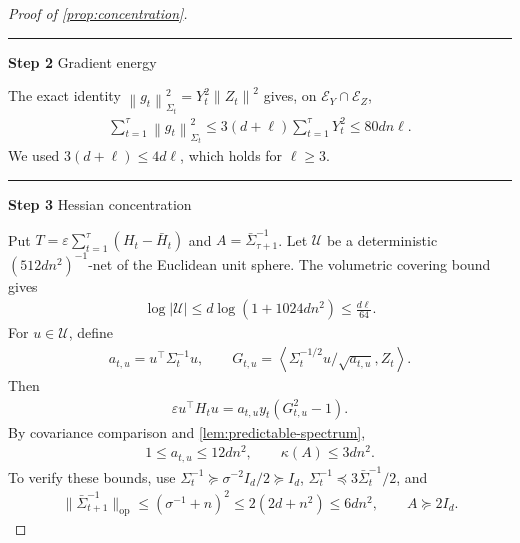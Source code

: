 \documentclass{article}
\newcommand{\proofstep}[2]{%
    \par\medskip
    \noindent
    \textcolor{blue!55!black}{\rule{2pt}{1.2em}}%
    \hspace{0.6em}%
    {\sffamily\bfseries\color{blue!55!black}Step #1}%
    \quad
    {\sffamily #2}%
    \par\smallskip
}
\newcommand{\op}{\mathrm{op}}
\newcommand{\1}{\mathbf 1}
\newcommand{\eps}{\varepsilon}
\newcommand{\ip}[2]{\left\langle #1,#2\right\rangle}
\newcommand{\norm}[1]{\left\lVert #1\right\rVert}
\newcommand{\normm}[2]{\left\lVert #1\right\rVert_{#2}}
\begin{document}
\begin{proof}[Proof of \cref{prop:concentration}]
    \proofstep{2}{Gradient energy}
    The exact identity
    $\normm{g_t}{\Sigma_t}^2=Y_t^2\norm{Z_t}^2$
    gives, on $\mathcal E_Y\cap\mathcal E_Z$,
    \begin{align}
        \sum_{t=1}^\tau\normm{g_t}{\Sigma_t}^2
        \leq3(d+\ell)\sum_{t=1}^\tau Y_t^2
        \leq80dn\ell.
    \end{align}
    We used $3(d+\ell)\leq4d\ell$, which holds for $\ell\geq3$.

    \proofstep{3}{Hessian concentration}
    Put $T=\eps\sum_{t=1}^\tau(H_t-\bar{H}_t)$ and
    $A=\bar{\Sigma}_{\tau+1}^{-1}$. Let $\mathcal U$ be a deterministic
    $(512dn^2)^{-1}$-net of the Euclidean unit sphere. The volumetric
    covering bound gives
    \begin{align}
        \log|\mathcal U|
        \leq d\log(1+1024dn^2)\leq\frac{d\ell}{64}.
        \label{eq:H-net-size}
    \end{align}
    For $u\in\mathcal U$, define
    \begin{align}
        a_{t,u}=u^\top\Sigma_t^{-1}u,
        \qquad
        G_{t,u}=
        \ip{\Sigma_t^{-1/2}u/\sqrt{a_{t,u}}}{Z_t}.
        \label{eq:H-standardisation}
    \end{align}
    Then
    \begin{align}
        \eps u^\top H_tu
        =a_{t,u}y_t(G_{t,u}^2-1).
        \label{eq:H-direction}
    \end{align}
    By covariance comparison and \cref{lem:predictable-spectrum},
    \begin{align}
        1\leq a_{t,u}\leq12dn^2,
        \qquad
        \kappa(A)\leq3dn^2.
        \label{eq:concentration-spectrum}
    \end{align}
    To verify these bounds, use
    $\Sigma_t^{-1}\succeq\sigma^{-2}I_d/2\succeq I_d$,
    $\Sigma_t^{-1}\preceq3\bar{\Sigma}_t^{-1}/2$, and
    \begin{align}
        \|\bar{\Sigma}_{t+1}^{-1}\|_{\op}
        \leq(\sigma^{-1}+n)^2
        \leq2(2d+n^2)\leq6dn^2,
        \qquad A\succeq2I_d.
    \end{align}


\end{proof}
\end{document}
